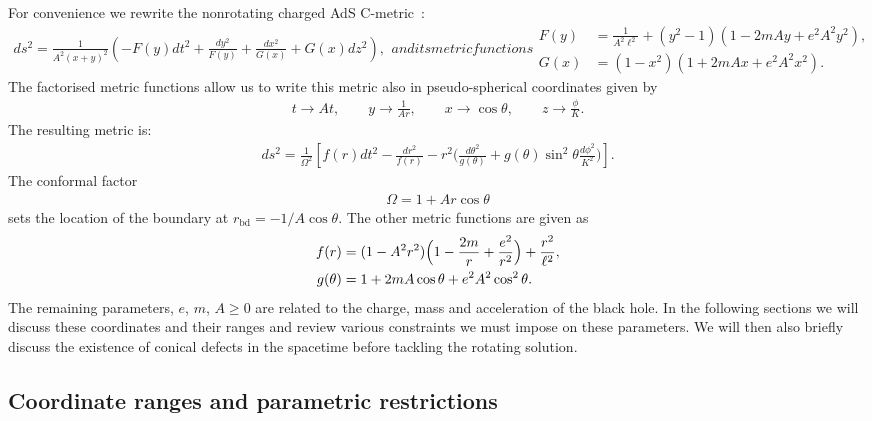 \documentclass[
twoside,
openright,
frontopenright,
]{dmathesis}
\newcommand{\nn}{\nonumber}
\newcommand{\bd}{\mathrm{bd}}
\begin{document}
For convenience we rewrite the nonrotating charged AdS
C-metric~\cite{Hong:2003gx,Hong:2004dm}:
\begin{subequations}
  \label{eq:NRyx}
  \begin{align}
    \label{eq:NRyx-metric}
    ds^2 = \frac{1}{A^2(x+y)^2} \left(-F(y)dt^2 + \frac{dy^2}{F(y)} +
    \frac{dx^2}{G(x)} + G(x) dz^2\right),
  \end{align}
  and its metric functions
  \begin{align}
    \label{eq:NRyx-fn}
    F(y)&=\frac{1}{A^2 \ell^2} + (y^2 - 1)(1-2mAy+e^2A^2y^2),\nn\\
    G(x)&=(1-x^2)(1+2mAx+e^2A^2x^2).
  \end{align}
\end{subequations}
The factorised metric functions allow us to write this metric also in
pseudo-spherical coordinates given by
\begin{gather}
  t \to At, \qquad y \to \frac{1}{Ar}, \qquad x \to \cos\theta, \qquad z \to
  \frac{\phi}{K}.
\end{gather}
The resulting metric is:
\begin{align}
\label{eq:NRrth-metric}
ds^2=\frac{1}{\Omega^2}\left[ 
f(r) dt^2
-\frac{dr^2}{f(r)} - r^2 \Big( \frac{d\theta^2}{g(\theta)} 
+ g(\theta)\sin^2\theta \frac{d\phi^2}{K^2}\Big)\right].
\end{align}
The conformal factor
\begin{align}\label{eq:conf}
\Omega=1+Ar\cos\theta
\end{align}
sets the location of the boundary at $r_\bd=-1/A\cos\theta$. The other metric
functions are given as
\begin{align}
\label{eq:NRrth-fn}
f(r)&=(1-A^2r^2)\Bigl(1-\frac{2 m}{r}+\frac{e^2}{r^2}\Bigr)
+\frac{r^2}{\ell^2},\nn\\
g(\theta)&=1+2mA \cos\theta+ e^2A^2 \cos^2\theta.
\end{align}
The remaining parameters, $e$, $m$, $A\geqslant 0$ are related to the charge,
mass and acceleration of the black hole. In the following sections we will
discuss these coordinates and their ranges and review various constraints we
must impose on these parameters. We will then also briefly discuss the existence
of conical defects in the spacetime before tackling the rotating solution.

\subsection{Coordinate ranges and parametric restrictions}
\label{sec:parameters}
\end{document}
